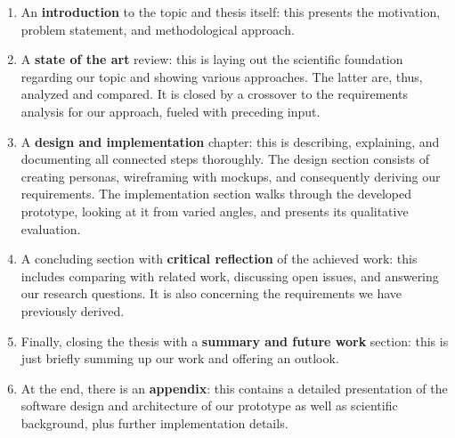 \begin{enumerate}
  \item An \textbf{introduction} to the topic and thesis itself: this presents the motivation, problem statement, and methodological approach.
  \item A \textbf{state of the art} review: this is laying out the scientific foundation regarding our topic and showing various approaches. The latter are, thus, analyzed and compared. It is closed by a crossover to the requirements analysis for our approach, fueled with preceding input.
  \item A \textbf{design and implementation} chapter: this is describing, explaining, and documenting all connected steps thoroughly. The design section consists of creating personas, wireframing with mockups, and consequently deriving our requirements. The implementation section walks through the developed prototype, looking at it from varied angles, and presents its qualitative evaluation.
  \item A concluding section with \textbf{critical reflection} of the achieved work: this includes comparing with related work, discussing open issues, and answering our research questions. It is also concerning the requirements we have previously derived.
  \item Finally, closing the thesis with a \textbf{summary and future work} section: this is just briefly summing up our work and offering an outlook.
  \item At the end, there is an \textbf{appendix}: this contains a detailed presentation of the software design and architecture of our prototype as well as scientific background, plus further implementation details.
\end{enumerate}
